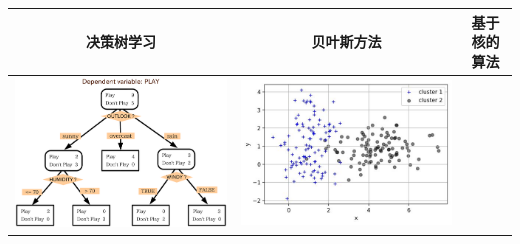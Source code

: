 \begin{longtable}[]{ccc}
    \label{fig:2.5.3}
  \toprule
  决策树学习 & 贝叶斯方法 & 基于核的算法
\tabularnewline
\midrule
\endhead
\begin{minipage}{0.1\linewidth}
  \includegraphics[width=1.0\linewidth]{./img/ch2/dec.png}  
\end{minipage}
&
\begin{minipage}{0.1\linewidth}
  \includegraphics[width=1.0\linewidth]{./img/ch2/sec1/5.jpg}  
\end{minipage}
&
\begin{minipage}{0.1\linewidth}

\end{minipage}
\end{longtable}
